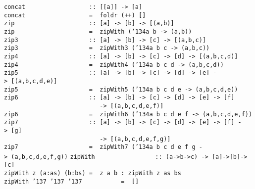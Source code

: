%
%
\eprogB\noindent\bprogB
\mbox{\tt concat\ \ \ \ \ \ \ \ \ \ \ \ \ \ \ \ \ \ ::\ [[a]]\ ->\ [a]}\\
\mbox{\tt concat\ \ \ \ \ \ \ \ \ \ \ \ \ \ \ \ \ \ =\ \ foldr\ (++)\ []}
%
\eprogB\noindent\bprogB
\mbox{\tt zip\ \ \ \ \ \ \ \ \ \ \ \ \ \ \ \ \ \ \ \ \ ::\ [a]\ ->\ [b]\ ->\ [(a,b)]}\\
\mbox{\tt zip\ \ \ \ \ \ \ \ \ \ \ \ \ \ \ \ \ \ \ \ \ =\ \ zipWith\ ({\char'134}a\ b\ ->\ (a,b))}
%
\eprogB\noindent\bprogB
\mbox{\tt zip3\ \ \ \ \ \ \ \ \ \ \ \ \ \ \ \ \ \ \ \ ::\ [a]\ ->\ [b]\ ->\ [c]\ ->\ [(a,b,c)]}\\
\mbox{\tt zip3\ \ \ \ \ \ \ \ \ \ \ \ \ \ \ \ \ \ \ \ =\ \ zipWith3\ ({\char'134}a\ b\ c\ ->\ (a,b,c))}
%
\eprogB\noindent\bprogB
\mbox{\tt zip4\ \ \ \ \ \ \ \ \ \ \ \ \ \ \ \ \ \ \ \ ::\ [a]\ ->\ [b]\ ->\ [c]\ ->\ [d]\ ->\ [(a,b,c,d)]}\\
\mbox{\tt zip4\ \ \ \ \ \ \ \ \ \ \ \ \ \ \ \ \ \ \ \ =\ \ zipWith4\ ({\char'134}a\ b\ c\ d\ ->\ (a,b,c,d))}
%
\eprogB\noindent\bprogB
\mbox{\tt zip5\ \ \ \ \ \ \ \ \ \ \ \ \ \ \ \ \ \ \ \ ::\ [a]\ ->\ [b]\ ->\ [c]\ ->\ [d]\ ->\ [e]\ ->\ [(a,b,c,d,e)]}\\
\mbox{\tt zip5\ \ \ \ \ \ \ \ \ \ \ \ \ \ \ \ \ \ \ \ =\ \ zipWith5\ ({\char'134}a\ b\ c\ d\ e\ ->\ (a,b,c,d,e))}
%
\eprogB\noindent\bprogB
\mbox{\tt zip6\ \ \ \ \ \ \ \ \ \ \ \ \ \ \ \ \ \ \ \ ::\ [a]\ ->\ [b]\ ->\ [c]\ ->\ [d]\ ->\ [e]\ ->\ [f]}\\
\mbox{\tt \ \ \ \ \ \ \ \ \ \ \ \ \ \ \ \ \ \ \ \ \ \ \ \ \ \ \ ->\ [(a,b,c,d,e,f)]}\\
\mbox{\tt zip6\ \ \ \ \ \ \ \ \ \ \ \ \ \ \ \ \ \ \ \ =\ \ zipWith6\ ({\char'134}a\ b\ c\ d\ e\ f\ ->\ (a,b,c,d,e,f))}
%
\eprogB\noindent\bprogB
\mbox{\tt zip7\ \ \ \ \ \ \ \ \ \ \ \ \ \ \ \ \ \ \ \ ::\ [a]\ ->\ [b]\ ->\ [c]\ ->\ [d]\ ->\ [e]\ ->\ [f]\ ->\ [g]}\\
\mbox{\tt \ \ \ \ \ \ \ \ \ \ \ \ \ \ \ \ \ \ \ \ \ \ \ \ \ \ \ ->\ [(a,b,c,d,e,f,g)]}\\
\mbox{\tt zip7\ \ \ \ \ \ \ \ \ \ \ \ \ \ \ \ \ \ \ \ =\ \ zipWith7\ ({\char'134}a\ b\ c\ d\ e\ f\ g\ ->\ (a,b,c,d,e,f,g))}
%
\eprogB\noindent\bprogB
\mbox{\tt zipWith\ \ \ \ \ \ \ \ \ \ \ \ \ \ \ \ \ ::\ (a->b->c)\ ->\ [a]->[b]->[c]}\\
\mbox{\tt zipWith\ z\ (a:as)\ (b:bs)\ =\ \ z\ a\ b\ :\ zipWith\ z\ as\ bs}\\
\mbox{\tt zipWith\ {\char'137}\ {\char'137}\ {\char'137}\ \ \ \ \ \ \ \ \ \ \ =\ \ []}
